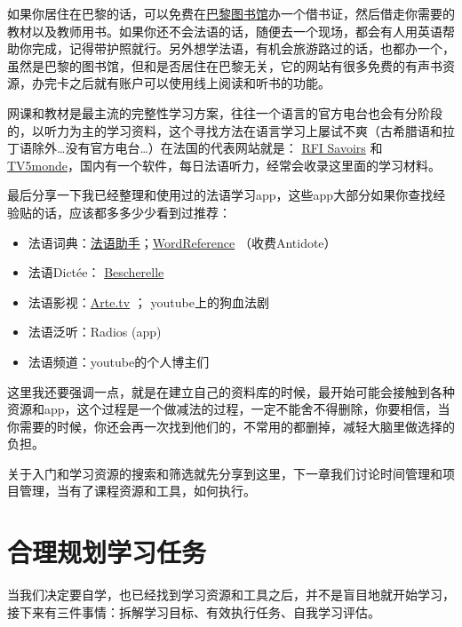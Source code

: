\documentclass[
]{book}
\providecommand{\tightlist}{%
  \setlength{\itemsep}{0pt}\setlength{\parskip}{0pt}}
\begin{document}
如果你居住在巴黎的话，可以免费在\href{https://bibliotheques.paris.fr/}{巴黎图书馆}办一个借书证，然后借走你需要的教材以及教师用书。如果你还不会法语的话，随便去一个现场，都会有人用英语帮助你完成，记得带护照就行。另外想学法语，有机会旅游路过的话，也都办一个，虽然是巴黎的图书馆，但和是否居住在巴黎无关，它的网站有很多免费的有声书资源，办完卡之后就有账户可以使用线上阅读和听书的功能。

网课和教材是最主流的完整性学习方案，往往一个语言的官方电台也会有分阶段的，以听力为主的学习资料，这个寻找方法在语言学习上屡试不爽（古希腊语和拉丁语除外\ldots 没有官方电台\ldots）在法国的代表网站就是： \href{https://savoirs.rfi.fr/fr}{RFI Savoirs} 和 \href{https://apprendre.tv5monde.com/fr}{TV5monde}，国内有一个软件，每日法语听力，经常会收录这里面的学习材料。

最后分享一下我已经整理和使用过的法语学习app，这些app大部分如果你查找经验贴的话，应该都多多少少看到过推荐：

\begin{itemize}
\tightlist
\item
  法语词典：\href{https://www.frdic.com/}{法语助手}；\href{https://www.wordreference.com/}{WordReference} （收费Antidote）
\item
  法语Dictée： \href{https://bescherelle.com/laccord-du-participe-passe}{Bescherelle}
\item
  法语影视：\href{https://www.arte.tv/fr/}{Arte.tv} ； youtube上的狗血法剧
\item
  法语泛听：Radios (app)
\item
  法语频道：youtube的个人博主们
\end{itemize}

这里我还要强调一点，就是在建立自己的资料库的时候，最开始可能会接触到各种资源和app，这个过程是一个做减法的过程，一定不能舍不得删除，你要相信，当你需要的时候，你还会再一次找到他们的，不常用的都删掉，减轻大脑里做选择的负担。

关于入门和学习资源的搜索和筛选就先分享到这里，下一章我们讨论时间管理和项目管理，当有了课程资源和工具，如何执行。

\hypertarget{ux5408ux7406ux89c4ux5212ux5b66ux4e60ux4efbux52a1}{%
\chapter{合理规划学习任务}\label{ux5408ux7406ux89c4ux5212ux5b66ux4e60ux4efbux52a1}}

当我们决定要自学，也已经找到学习资源和工具之后，并不是盲目地就开始学习，接下来有三件事情：拆解学习目标、有效执行任务、自我学习评估。
\end{document}
